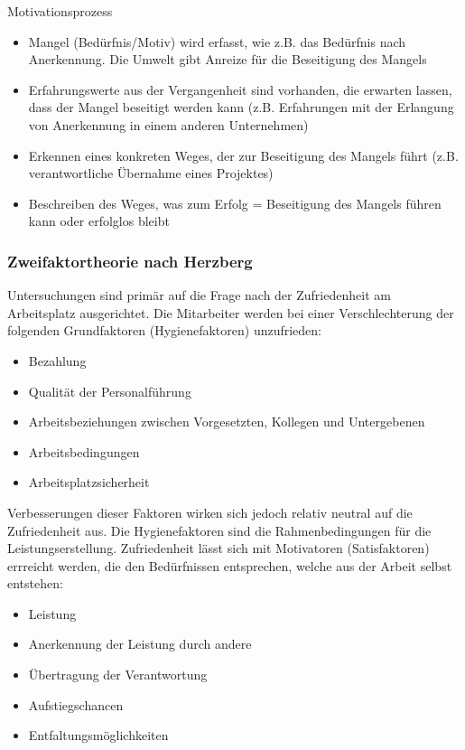 Motivationsprozess
\begin{itemize}
	\item Mangel (Bedürfnis/Motiv) wird erfasst, wie z.B. das Bedürfnis nach Anerkennung. Die Umwelt gibt Anreize für die Beseitigung des Mangels
	\item Erfahrungswerte aus der Vergangenheit sind vorhanden, die erwarten lassen, dass der Mangel beseitigt werden kann (z.B. Erfahrungen mit der Erlangung von Anerkennung in einem anderen Unternehmen)
	\item Erkennen eines konkreten Weges, der zur Beseitigung des Mangels führt (z.B. verantwortliche Übernahme eines Projektes)
	\item Beschreiben des Weges, was zum Erfolg = Beseitigung des Mangels führen kann oder erfolglos bleibt
\end{itemize}

\subsubsection{Zweifaktortheorie nach Herzberg}

Untersuchungen sind primär auf die Frage nach der Zufriedenheit am Arbeitsplatz ausgerichtet. Die Mitarbeiter werden bei einer Verschlechterung der folgenden Grundfaktoren (Hygienefaktoren) unzufrieden:

\begin{itemize}
	\item Bezahlung
	\item Qualität der Personalführung
	\item Arbeitsbeziehungen zwischen Vorgesetzten, Kollegen und Untergebenen
	\item Arbeitsbedingungen
	\item Arbeitsplatzsicherheit
\end{itemize}

Verbesserungen dieser Faktoren wirken sich jedoch relativ neutral auf die Zufriedenheit aus. Die Hygienefaktoren sind die Rahmenbedingungen für die Leistungserstellung. Zufriedenheit lässt sich mit Motivatoren (Satisfaktoren) errreicht werden, die den Bedürfnissen entsprechen, welche aus der Arbeit selbst entstehen:

\begin{itemize}
	\item Leistung
	\item Anerkennung der Leistung durch andere
	\item Übertragung der Verantwortung
	\item Aufstiegschancen
	\item Entfaltungsmöglichkeiten
\end{itemize}

